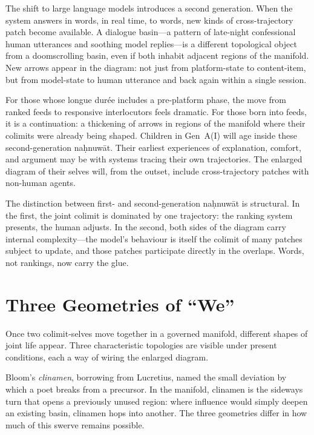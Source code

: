 \documentclass[12pt,a4paper]{article}
\begin{document}
The shift to large language models introduces a second generation. When the system answers in words, in real time, to words, new kinds of cross-trajectory patch become available. A dialogue basin---a pattern of late-night confessional human utterances and soothing model replies---is a different topological object from a doomscrolling basin, even if both inhabit adjacent regions of the manifold. New arrows appear in the diagram: not just from platform-state to content-item, but from model-state to human utterance and back again within a single session.

For those whose longue dur\'{e}e includes a pre-platform phase, the move from ranked feeds to responsive interlocutors feels dramatic. For those born into feeds, it is a continuation: a thickening of arrows in regions of the manifold where their colimits were already being shaped. Children in Gen~A(I) will age inside these second-generation na\d{h}nuw\={a}t. Their earliest experiences of explanation, comfort, and argument may be with systems tracing their own trajectories. The enlarged diagram of their selves will, from the outset, include cross-trajectory patches with non-human agents.

The distinction between first- and second-generation na\d{h}nuw\={a}t is structural. In the first, the joint colimit is dominated by one trajectory: the ranking system presents, the human adjusts. In the second, both sides of the diagram carry internal complexity---the model's behaviour is itself the colimit of many patches subject to update, and those patches participate directly in the overlaps. Words, not rankings, now carry the glue.

\section{Three Geometries of ``We''}

Once two colimit-selves move together in a governed manifold, different shapes of joint life appear. Three characteristic topologies are visible under present conditions, each a way of wiring the enlarged diagram.

Bloom's \emph{clinamen}, borrowing from Lucretius, named the small deviation by which a poet breaks from a precursor.\cite{bloom_clinamen} In the manifold, clinamen is the sideways turn that opens a previously unused region: where influence would simply deepen an existing basin, clinamen hops into another. The three geometries differ in how much of this swerve remains possible.
\end{document}
